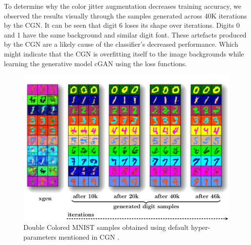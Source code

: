 To determine why the color jitter augmentation decreases training accuracy, we observed the results visually through the samples generated across 40K iterations by the CGN. 
It can be seen that digit 6 loses its shape over iterations. Digits 0 and 1 have the same background and similar digit font. These artefacts produced by the CGN\cite{sauer2021counterfactual} are a likely cause of the classifier's decreased performance. Which might indicate that the CGN is overfitting itself to the image backgrounds while learning the generative model cGAN using the loss functions. 

\begin{figure}[H]
    \centering
    \includegraphics[width=0.9\linewidth]{../openreview/images/x_gen_original.pdf}
        \caption{Double Colored MNIST samples obtained using default hyper-parameters mentioned in CGN \cite{sauer2021counterfactual}.
        }
    \label{fig:original_grid}
\end{figure}

